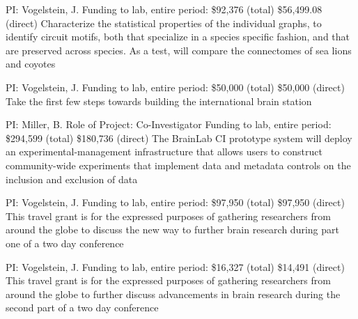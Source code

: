 \documentclass[10pt,colorlinks=true,urlcolor=blue]{moderncv}
\begin{document}
    {\newline PI: Vogelstein, J. 
    \newline Funding to lab, entire period: \$92,376 (total) \$56,499.08 (direct)
    \newline Characterize the statistical properties of the individual graphs, to identify circuit motifs,
    both that specialize in a species specific fashion, and that are preserved across species.
    As a test, will compare the connectomes of sea lions and coyotes}{}{}{}
    
    {\newline PI: Vogelstein, J.
    \newline Funding to lab, entire period: \$50,000 (total) \$50,000 (direct)
    \newline Take the first few steps towards building the international brain station}{}{}{}{}
    
    {\newline PI: Miller, B.
    \newline Role of Project: Co-Investigator
    \newline Funding to lab, entire period: \$294,599 (total) \$180,736 (direct)
    \newline The BrainLab CI prototype system will deploy an experimental-management
    infrastructure that allows users to construct community-wide experiments that implement
    data and metadata controls on the inclusion and exclusion of data}{}{}{}
    
    {\newline PI: Vogelstein, J.
    \newline Funding to lab, entire period: \$97,950 (total) \$97,950 (direct)
    \newline This travel grant is for the expressed purposes of gathering researchers from around the
    globe to discuss the new way to further brain research during part one of a two day
    conference}{}{}{}
    
    {\newline PI: Vogelstein, J.
    \newline Funding to lab, entire period: \$16,327 (total) \$14,491 (direct)
    \newline This travel grant is for the expressed purposes of gathering researchers from
    around the globe to further discuss advancements in brain research during the
    second part of a two day conference}{}{}{}
    
\end{document}
